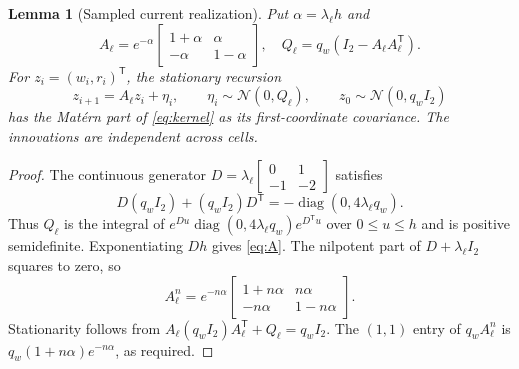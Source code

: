 \documentclass[journal]{IEEEtran}
\newtheorem{lemma}{Lemma}
\newcommand{\diag}{\operatorname{diag}}
\newcommand{\trans}{\mathsf{T}}
\newcommand{\Normal}{\mathcal{N}}
\begin{document}
\begin{lemma}[Sampled current realization]
\label{lem:current}
Put $\alpha=\lambda_\ell h$ and
\begin{equation}
 A_\ell=e^{-\alpha}
 \begin{bmatrix}1+\alpha&\alpha\\-\alpha&1-\alpha\end{bmatrix},
 \quad Q_\ell=q_w(I_2-A_\ell A_\ell^\trans).
 \label{eq:A}
\end{equation}
For $z_i=(w_i,r_i)^\trans$, the stationary recursion
\begin{equation}
 z_{i+1}=A_\ell z_i+\eta_i,\qquad
 \eta_i\sim\Normal(0,Q_\ell),\qquad
 z_0\sim\Normal(0,q_wI_2)
 \label{eq:z}
\end{equation}
has the Mat\'ern part of \eqref{eq:kernel} as its first-coordinate
covariance. The innovations are independent across cells.
\end{lemma}
\begin{proof}
The continuous generator
$D=\lambda_\ell\left[\begin{smallmatrix}0&1\\-1&-2\end{smallmatrix}\right]$
satisfies
\begin{equation}
 D(q_wI_2)+(q_wI_2)D^\trans
 =-\diag(0,4\lambda_\ell q_w).
\end{equation}
Thus $Q_\ell$ is the integral of
$e^{Du}\diag(0,4\lambda_\ell q_w)e^{D^\trans u}$ over $0\leq u\leq h$
and is positive semidefinite. Exponentiating $Dh$ gives \eqref{eq:A}.
The nilpotent part of $D+\lambda_\ell I_2$ squares to zero, so
\begin{equation}
 A_\ell^n=e^{-n\alpha}
 \begin{bmatrix}1+n\alpha&n\alpha\\-n\alpha&1-n\alpha\end{bmatrix}.
 \label{eq:An}
\end{equation}
Stationarity follows from $A_\ell(q_wI_2)A_\ell^\trans+Q_\ell=q_wI_2$.
The $(1,1)$ entry of $q_wA_\ell^n$ is
$q_w(1+n\alpha)e^{-n\alpha}$, as required.
\end{proof}
\end{document}
